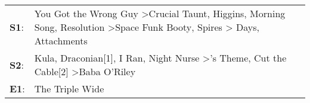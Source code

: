 \begin{supertabular}{p{0.03\textwidth}p{0.92\textwidth}}
 \textbf{S1}:  &  You Got the Wrong Guy\textsuperscript{} \textgreater \enspace Crucial Taunt\textsuperscript{}, \enspace Higgins\textsuperscript{}, \enspace Morning Song\textsuperscript{}, \enspace Resolution\textsuperscript{} \textgreater \enspace Space Funk Booty\textsuperscript{}, \enspace Spires\textsuperscript{} \textgreater {} Days\textsuperscript{}, \enspace Attachments\textsuperscript{}  \enspace  \\
 \textbf{S2}:  &                                                                                                         Kula\textsuperscript{}, \enspace Draconian[1]\textsuperscript{}, \enspace I Ran\textsuperscript{}, \enspace Night Nurse\textsuperscript{} \textgreater {}'s Theme\textsuperscript{}, \enspace Cut the Cable[2]\textsuperscript{} \textgreater \enspace Baba O'Riley\textsuperscript{}  \enspace  \\
 \textbf{E1}:  &                                                                                                                                                                                                                                                                                                                                                                      The Triple Wide\textsuperscript{}  \enspace  \\
\end{supertabular}
